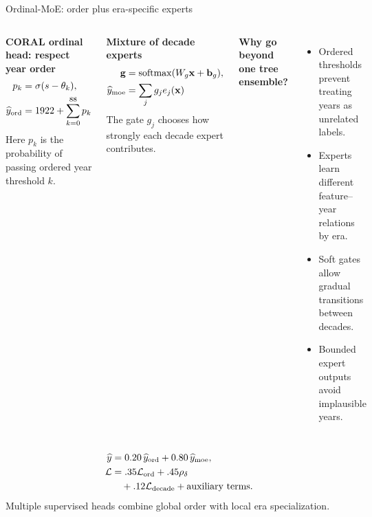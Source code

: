 \begin{frame}[shrink=12]{Ordinal-MoE: order plus era-specific experts}

\small

\begin{columns}[T,onlytextwidth]
	\textbf{CORAL ordinal head: respect year order}
	\[
	\begin{aligned}
	p_k&=\sigma(s-\theta_k),\\
	\widehat y_{\rm ord}&=1922+\sum_{k=0}^{88}p_k
	\end{aligned}
	\]
	Here $p_k$ is the probability of passing ordered year threshold $k$.

	\medskip
	\textbf{Mixture of decade experts}
	\[
	\begin{aligned}
	\mathbf{g}&=\operatorname{softmax}(W_g\mathbf{x}+\mathbf{b}_g),\\
	\widehat y_{\rm moe}&=\sum_j g_j e_j(\mathbf{x})
	\end{aligned}
	\]
	The gate $g_j$ chooses how strongly each decade expert contributes.

	\textbf{Why go beyond one tree ensemble?}
	\begin{itemize}
		\setlength{\itemsep}{2pt}
		\item Ordered thresholds prevent treating years as unrelated labels.
		\item Experts learn different feature--year relations by era.
		\item Soft gates allow gradual transitions between decades.
		\item Bounded expert outputs avoid implausible years.
	\end{itemize}
\end{columns}

\medskip
\[
\begin{aligned}
\widehat y&=0.20\,\widehat y_{\rm ord}+0.80\,\widehat y_{\rm moe},\\
\mathcal L&=.35\mathcal L_{\rm ord}+.45\rho_\delta\\
&\quad +.12\mathcal L_{\rm decade}+\text{auxiliary terms}.
\end{aligned}
\]
{\small Multiple supervised heads combine global order with local era
specialization.~{\scriptsize\autocite{cao2020coral,jacobs1991experts}}}

\end{frame}

